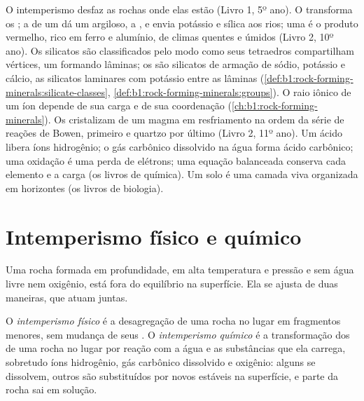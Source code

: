 \begin{recall}
O intemperismo desfaz as rochas onde elas estão (Livro 1, 5º ano). O  transforma os ; a  de um  dá um  argiloso, a , e envia potássio e sílica aos rios; uma  é o produto vermelho, rico em ferro e alumínio, de climas quentes e úmidos (Livro 2, 10º ano). Os silicatos são classificados pelo modo como seus tetraedros  compartilham vértices, um  formando lâminas; os  são silicatos de armação de sódio, potássio e cálcio, as  silicatos laminares com potássio entre as lâminas (\cref{def:b1:rock-forming-minerals:silicate-classes},
\cref{def:b1:rock-forming-minerals:groups}). O raio iônico de um íon depende de sua carga e de sua coordenação (\cref{ch:b1:rock-forming-minerals}). Os  cristalizam de um magma em resfriamento na ordem da série de reações de Bowen,  primeiro e quartzo por último (Livro 2, 11º ano). Um ácido libera íons hidrogênio; o gás carbônico dissolvido na água forma ácido carbônico; uma oxidação é uma perda de elétrons; uma equação balanceada conserva cada elemento e a carga (os livros de química). Um solo é uma camada viva organizada em horizontes (os livros de biologia).
\end{recall}

\section{Intemperismo físico e químico}\label{sec:b1:weathering-clays:types}

Uma rocha formada em profundidade, em alta temperatura e pressão e sem água livre nem oxigênio, está fora do equilíbrio na superfície. Ela se ajusta de duas maneiras, que atuam juntas.

\begin{definition}\label{def:b1:weathering-clays:weathering}
O \emph{intemperismo físico} é a desagregação de uma rocha no lugar em fragmentos menores, sem mudança de seus . O \emph{intemperismo químico} é a transformação dos  de uma rocha no lugar por reação com a água e as substâncias que ela carrega, sobretudo íons hidrogênio, gás carbônico dissolvido e oxigênio: alguns  se dissolvem, outros são substituídos por novos  estáveis na superfície, e parte da rocha sai em solução.
\end{definition}

